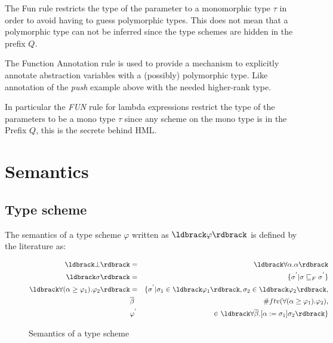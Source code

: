 \begin{prooftree}
\end{prooftree}

The Fun rule restricts the type of the parameter to a monomorphic type $\tau$ in order to avoid having to guess polymorphic types. This does not mean that a polymorphic type can not be inferred since the type schemes are hidden in the prefix $Q$.

\begin{prooftree}
\end{prooftree}

The Function Annotation rule is used to provide a mechanism to explicitly annotate abstraction variables with a (possibly) polymorphic type. Like annotation of the \textit{push} example above with the needed higher-rank type.

In particular the \textit{FUN} rule for lambda expressions restrict the type of the parameters to be a mono type $\tau$ since any scheme on the mono type is in the Prefix $Q$, this is the secrete behind HML.
\section{Semantics}
\subsection{Type scheme}
The semantics of a type scheme $\varphi$ written as $\br{\varphi}$  is defined by the literature as:
\begin{figure}[H]
\begin{eqnarray*}
\br{\bot} & = & \br{\forall\alpha . \alpha} \\
\br{\sigma} & = & \{ \sigma^{'} | \sigma \sqsubseteq_F \sigma^{'} \} \\
\br{\forall(\alpha \geq \varphi_1).\varphi_2} & = & \{ \sigma^{'} | \sigma_1  \in \br{\varphi_1}, \sigma_2 \in \br{\varphi_2}, \\ 
   &\overline{\beta}& \# ftv(\forall(\alpha \geq \varphi_1).\varphi_2), \\
   &\varphi^{'} & \in \br{\forall\overline{\beta}.\lbrack \alpha := \sigma_1 \rbrack\sigma_2}  \} 
\end{eqnarray*}
\caption{Semantics of a type scheme}
\end{figure}

